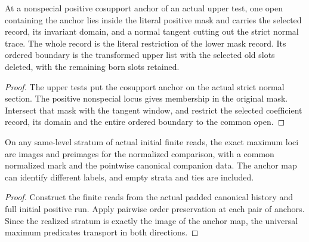 \begin{theorem}
\label{hir:g1-later-positive-mask-contact}
\leanok
At a nonspecial positive cosupport anchor of an actual upper test,
one open containing the anchor lies inside the literal positive
mask and carries the selected record, its invariant domain, and a
normal tangent cutting out the strict normal trace. The whole
record is the literal restriction of the lower mask record. Its
ordered boundary is the transformed upper list with the selected
old slots deleted, with the remaining born slots retained.
\end{theorem}
\begin{proof}
The upper tests put the cosupport anchor on the actual strict
normal section. The positive nonspecial locus gives membership
in the original mask. Intersect that mask with the tangent
window, and restrict the selected coefficient record, its domain
and the entire ordered boundary to the common open.
\end{proof}

\begin{theorem}
\label{hir:g1-initial-positive-finite-stratum}
\leanok
On any same-level stratum of actual initial finite reads,
the exact maximum loci are images and preimages for the
normalized comparison, with a common normalized mark and the
pointwise canonical companion data. The anchor map can identify
different labels, and empty strata and ties are included.
\end{theorem}
\begin{proof}
Construct the finite reads from the actual padded canonical history
and full initial positive run. Apply pairwise order preservation
at each pair of anchors. Since the realized stratum is exactly the
image of the anchor map, the universal maximum predicates
transport in both directions.
\end{proof}


